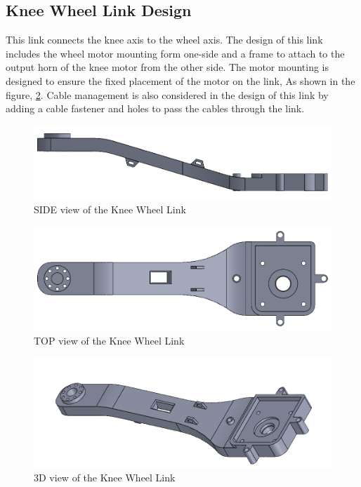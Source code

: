 \newpage
\subsection{Knee Wheel Link Design}
This link connects the knee axis to the wheel axis.
The design of this link includes the wheel motor mounting form one-side and a frame to attach to the output horn of the knee motor from the other side. The motor mounting is designed to ensure the fixed placement of the motor on the link, As shown in the figure, \ref{fig:wheelkneelink2}. Cable management is also considered in the design of this link by adding a cable fastener and holes to pass the cables through the link.
\begin{figure}[h]
	\centering
	\includegraphics[width=1\linewidth]{Wheel_Knee_Link_1}
	\caption[SIDE view of the Knee Wheel Link]{SIDE view of the Knee Wheel Link}
	\label{fig:wheelkneelink1}
\end{figure}
\begin{figure}[h]
	\centering
	\includegraphics[width=1\linewidth]{Wheel_Knee_Link_2}
	\caption[TOP view of the Knee Wheel Link]{TOP view of the Knee Wheel Link}
	\label{fig:wheelkneelink2}
\end{figure}
\begin{figure}[h]
	\centering
	\includegraphics[width=1\linewidth]{Wheel_Knee_Link_3}
	\caption[3D view of the Knee Wheel Link]{3D view of the Knee Wheel Link}
	\label{fig:wheelkneelink3}
\end{figure}


